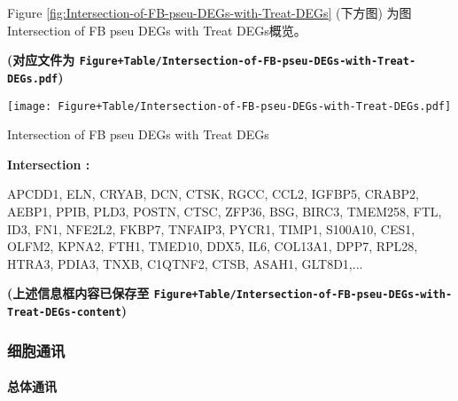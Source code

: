 \documentclass[
]{article}
\newenvironment{Shaded}{\begin{snugshade}}{\end{snugshade}}
\newcommand{\DataTypeTok}[1]{\textcolor[rgb]{0.13,0.29,0.53}{#1}}
\newcommand{\KeywordTok}[1]{\textcolor[rgb]{0.13,0.29,0.53}{\textbf{#1}}}
\newcommand{\NormalTok}[1]{#1}
\newcommand{\OperatorTok}[1]{\textcolor[rgb]{0.81,0.36,0.00}{\textbf{#1}}}
\newcommand{\StringTok}[1]{\textcolor[rgb]{0.31,0.60,0.02}{#1}}
\begin{document}
\begin{Shaded}
\end{Shaded}

Figure \ref{fig:Intersection-of-FB-pseu-DEGs-with-Treat-DEGs} (下方图) 为图Intersection of FB pseu DEGs with Treat DEGs概览。

\textbf{(对应文件为 \texttt{Figure+Table/Intersection-of-FB-pseu-DEGs-with-Treat-DEGs.pdf})}

\def\@captype{figure}
\begin{center}
\texttt{[image: Figure+Table/Intersection-of-FB-pseu-DEGs-with-Treat-DEGs.pdf]}
\caption{Intersection of FB pseu DEGs with Treat DEGs}\label{fig:Intersection-of-FB-pseu-DEGs-with-Treat-DEGs}
\end{center}
\begin{center}\begin{tcolorbox}[colback=gray!10, colframe=gray!50, width=0.9\linewidth, arc=1mm, boxrule=0.5pt]
\textbf{
Intersection
:}

\vspace{0.5em}

    APCDD1, ELN, CRYAB, DCN, CTSK, RGCC, CCL2, IGFBP5,
CRABP2, AEBP1, PPIB, PLD3, POSTN, CTSC, ZFP36, BSG, BIRC3,
TMEM258, FTL, ID3, FN1, NFE2L2, FKBP7, TNFAIP3, PYCR1,
TIMP1, S100A10, CES1, OLFM2, KPNA2, FTH1, TMED10, DDX5,
IL6, COL13A1, DPP7, RPL28, HTRA3, PDIA3, TNXB, C1QTNF2,
CTSB, ASAH1, GLT8D1,...

\vspace{2em}
\end{tcolorbox}
\end{center}

\textbf{(上述信息框内容已保存至 \texttt{Figure+Table/Intersection-of-FB-pseu-DEGs-with-Treat-DEGs-content})}

\hypertarget{ux7ec6ux80deux901aux8baf}{%
\subsubsection{细胞通讯}\label{ux7ec6ux80deux901aux8baf}}

\hypertarget{ux603bux4f53ux901aux8baf}{%
\paragraph{总体通讯}\label{ux603bux4f53ux901aux8baf}}
\end{document}
